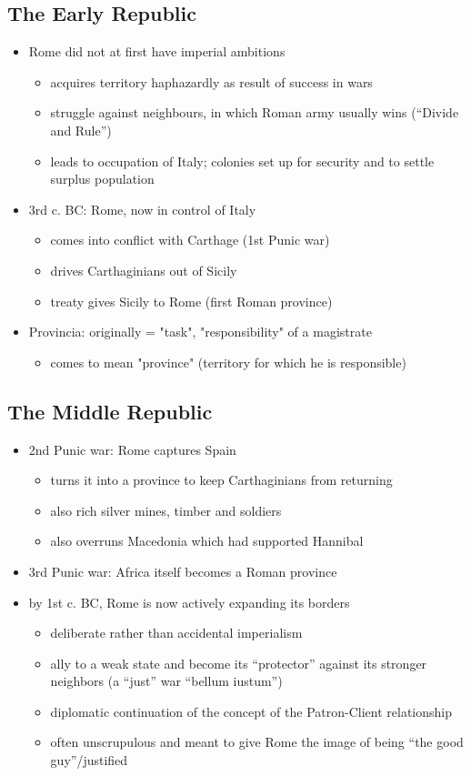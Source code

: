 \documentclass[12pt, twoside]{article}
\begin{document}
\subsection{The Early Republic}
\begin{itemize}
\item Rome did not at first have imperial ambitions
	\begin{itemize}
	\item acquires territory haphazardly as result of success in wars
	\item struggle against neighbours, in which Roman army usually wins (“Divide and Rule”)
	\item leads to occupation of Italy; colonies set up for security and to settle surplus population
	\end{itemize}
\item 3rd c. BC: Rome, now in control of Italy
	\begin{itemize}
	\item comes into conflict with Carthage (1st Punic war)
	\item drives Carthaginians out of Sicily
	\item treaty gives Sicily to Rome (first Roman province)
	\end{itemize}
\item Provincia: originally = "task", "responsibility" of a magistrate
	\begin{itemize}
	\item comes to mean "province" (territory for which he is responsible)
	\end{itemize}
\end{itemize}

\subsection{The Middle Republic}
\begin{itemize}
\item 2nd Punic war: Rome captures Spain
	\begin{itemize}
	\item turns it into a province to keep Carthaginians from returning
	\item also rich silver mines, timber and soldiers
	\item also overruns Macedonia which had supported Hannibal
	\end{itemize}
\item 3rd Punic war: Africa itself becomes a Roman province
\item by 1st c. BC, Rome is now actively expanding its borders
	\begin{itemize}
	\item deliberate rather than accidental imperialism
	\item ally to a weak state and become its “protector” against its stronger neighbors (a “just” war “bellum iustum”)
	\item diplomatic continuation of the concept of the Patron-Client relationship
	\item often unscrupulous and meant to give Rome the image of being “the good guy”/justified
	\end{itemize}
\end{itemize}
\end{document}
